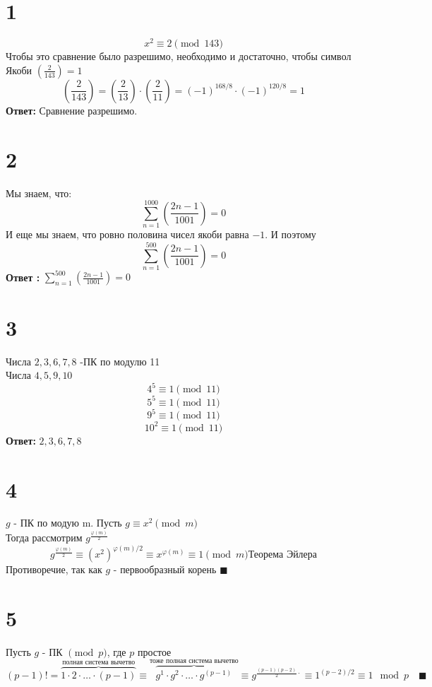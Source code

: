 

	\section*{1}
	$$x^2\equiv 2\pmod{143}$$
	Чтобы это сравнение было разрешимо, необходимо и достаточно, чтобы  символ Якоби $\left(\frac{	2}{143}\right) = 1$ \\
	$$\left(\frac{2}{143}\right) =\left(\frac{2}{13}\right)\cdot \left(\frac{2}{11}\right) = (-1)^{168/8}\cdot (-1)^{120/8} = 1   $$
	\textbf{Ответ: } Сравнение разрешимо.
	\section*{2}
	Мы знаем, что: 
	$$\sum\limits_{n=1}^{1000}\left(\frac{2n-1}{1001}\right) = 0$$
	И еще мы знаем, что ровно половина чисел якоби равна $-1$. И поэтому $$\sum\limits_{n=1}^{500}\left(\frac{2n-1}{1001}\right) = 0$$
	\textbf{Ответ :} $\sum\limits_{n=1}^{500}\left(\frac{2n-1}{1001}\right) = 0$
	\section*{3}
	Числа $2, 3, 6, 7,8 $ -ПК по модулю 11 \\
	Числа $4, 5, 9, 10$ \\
	$$4^5\equiv1 \pmod{11}$$
	$$5^5 \equiv1 \pmod{11}$$
	$$9^5\equiv 1\pmod{11}$$
	$$10^2\equiv1\pmod{11}$$
		\textbf{Ответ: } $2, 3, 6, 7,8 $ 
	\section*{4}
 $g$ - ПК по модую m. Пусть $g\equiv x^2\pmod{m}$\\
 Тогда рассмотрим  $g^{\frac{\varphi(m)}{2}}$
 $$g^{\frac{\varphi(m)}{2}} \equiv (x^2)^{\varphi(m)/2} \equiv x^{\varphi(m)} \equiv 1\pmod{m}\text{Теорема Эйлера}$$
 Противоречие, так как $g $ - первообразный корень $\blacksquare$
 \section*{5}
  Пусть $g$ - ПК $\pmod{p}$, где $p $ простое
 	$$(p-1)! = \overbrace{1\cdot 2\cdot \dots \cdot(p-1)}^{\text{полная система вычетво}} \equiv \overbrace{g^1\cdot g^2\cdot \dots \cdot g^{(p-1)}}^{\text{тоже полная система вычетво}}\equiv g^{\frac{(p-1)(p-2)}{2}\cdot }\equiv 1^{(p-2)/2} \equiv1 \mod{p}\quad\blacksquare$$ 
		
